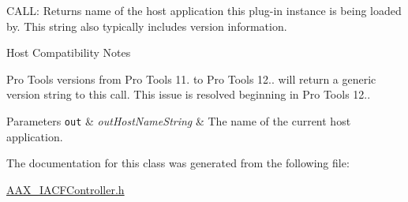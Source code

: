 C\+A\+L\+L\+: Returns name of the host application this plug-\/in instance is being loaded by. This string also typically includes version information. 

\begin{DoxyRefDesc}{Host Compatibility Notes}
\item[\hyperlink{a00380__compatibility_notes000055}{Host Compatibility Notes}]Pro Tools versions from Pro Tools 11. to Pro Tools 12.. will return a generic version string to this call. This issue is resolved beginning in Pro Tools 12..\end{DoxyRefDesc}



\begin{DoxyParams}[1]{Parameters}
\mbox{\tt out}  & {\em out\+Host\+Name\+String} & The name of the current host application. \\
\hline
\end{DoxyParams}


The documentation for this class was generated from the following file\+:\begin{DoxyCompactItemize}
\item 
\hyperlink{a00219}{A\+A\+X\+\_\+\+I\+A\+C\+F\+Controller.\+h}\end{DoxyCompactItemize}
